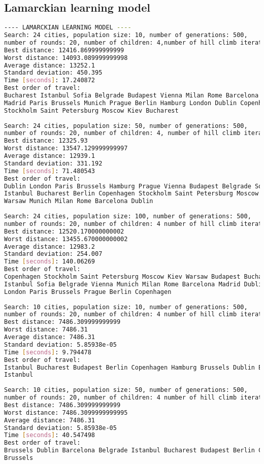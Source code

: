 \documentclass{article}
\begin{document}
\subsection{Lamarckian learning model}
\begin{lstlisting}[language=bash]
---- LAMARCKIAN LEARNING MODEL ----
Search: 24 cities, population size: 10, number of generations: 500, 
number of rounds: 20, number of children: 4,number of hill climb iterations: 3: 
Best distance: 12416.869999999999
Worst distance: 14093.089999999998
Average distance: 13252.1
Standard deviation: 450.395
Time [seconds]: 17.240872
Best order of travel: 
Bucharest Istanbul Sofia Belgrade Budapest Vienna Milan Rome Barcelona 
Madrid Paris Brussels Munich Prague Berlin Hamburg London Dublin Copenhagen 
Stockholm Saint Petersburg Moscow Kiev Bucharest
 
Search: 24 cities, population size: 50, number of generations: 500, 
number of rounds: 20, number of children: 4, number of hill climb iterations: 3: 
Best distance: 12325.93
Worst distance: 13547.129999999997
Average distance: 12939.1
Standard deviation: 331.192
Time [seconds]: 71.480543
Best order of travel: 
Dublin London Paris Brussels Hamburg Prague Vienna Budapest Belgrade Sofia 
Istanbul Bucharest Berlin Copenhagen Stockholm Saint Petersburg Moscow Kiev 
Warsaw Munich Milan Rome Barcelona Dublin
 
Search: 24 cities, population size: 100, number of generations: 500, 
number of rounds: 20, number of children: 4 number of hill climb iterations: 3: 
Best distance: 12520.170000000002
Worst distance: 13455.670000000002
Average distance: 12983.2
Standard deviation: 254.007
Time [seconds]: 140.06269
Best order of travel: 
Copenhagen Stockholm Saint Petersburg Moscow Kiev Warsaw Budapest Bucharest 
Istanbul Sofia Belgrade Vienna Munich Milan Rome Barcelona Madrid Dublin 
London Paris Brussels Prague Berlin Copenhagen
 
Search: 10 cities, population size: 10, number of generations: 500, 
number of rounds: 20, number of children: 4 number of hill climb iterations: 3: 
Best distance: 7486.309999999999
Worst distance: 7486.31
Average distance: 7486.31
Standard deviation: 5.85938e-05
Time [seconds]: 9.794478
Best order of travel: 
Istanbul Bucharest Budapest Berlin Copenhagen Hamburg Brussels Dublin Barcelona 
Istanbul
 
Search: 10 cities, population size: 50, number of generations: 500, 
number of rounds: 20, number of children: 4 number of hill climb iterations: 3: 
Best distance: 7486.309999999999
Worst distance: 7486.3099999999995
Average distance: 7486.31
Standard deviation: 5.85938e-05
Time [seconds]: 40.547498
Best order of travel: 
Brussels Dublin Barcelona Belgrade Istanbul Bucharest Budapest Berlin Copenhagen 
Brussels
 

\end{lstlisting}
\end{document}
